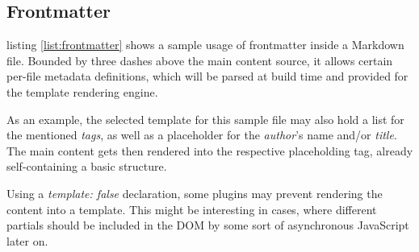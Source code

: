 \subsection{Frontmatter}
\label{sec:buildpipelines-frontmatter}



listing \ref{list:frontmatter} shows a sample usage of frontmatter inside a Markdown file. Bounded by three dashes above the main content source, it allows certain per-file metadata definitions, which will be parsed at build time and provided for the template rendering engine.

As an example, the selected template for this sample file may also hold a list for the mentioned \emph{tags}, as well as a placeholder for the \emph{author}'s name and/or \emph{title}. The main content gets then rendered into the respective placeholding tag, already self-containing a basic structure.

Using a \emph{template: false} declaration, some plugins may prevent rendering the content into a template. This might be interesting in cases, where different partials should be included in the DOM by some sort of asynchronous JavaScript later on.
